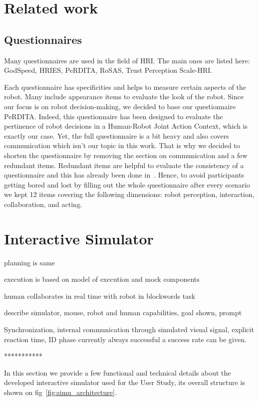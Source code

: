 \section{Related work}

\subsection{Questionnaires}
Many questionnaires are used in the field of HRI. The main ones are listed here: GodSpeed, HRIES, PeRDITA, RoSAS, Trust Perception Scale-HRI. 

Each questionnaire has specificities and helps to measure certain aspects of the robot. Many include appearance items to evaluate the look of the robot. Since our focus is on robot decision-making, we decided to base our questionnaire PeRDITA. Indeed, this questionnaire has been designed to evaluate the pertinence of robot decisions in a Human-Robot Joint Action Context, which is exactly our case. Yet, the full questionnaire is a bit heavy and also covers communication which isn't our topic in this work. 
That is why we decided to shorten the questionnaire by removing the section on communication and a few redundant items. Redundant items are helpful to evaluate the consistency of a questionnaire and this has already been done in~\cite{devin_evaluating_2018}. Hence, to avoid participants getting bored and lost by filling out the whole questionnaire after every scenario we kept 12 items covering the following dimensions: robot perception, interaction, collaboration, and acting.


\section{Interactive Simulator}
planning is same

execution is based on model of execution and mock components

human collaborates in real time with robot in blockwords task

describe simulator, mouse, robot and human capabilities, goal shown, prompt

Synchronization, internal communication through simulated visual signal, explicit reaction time, ID phase currently always successful a success rate can be given. 



***********

In this section we provide a few functional and technical details about the developed interactive simulator used for the User Study, its overall structure is shown on fig~\ref{fig:simu_architecture}.

